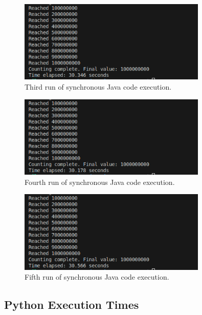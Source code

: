 \documentclass[12pt,a4paper]{article}
\begin{document}
\begin{figure}[htbp]
    \centering
    \includegraphics[width=0.8\textwidth]{../sync_records/results_java/result_3.png}
    \caption{Third run of synchronous Java code execution.}
    \label{fig:Java-runtime-3}
\end{figure}

\begin{figure}[htbp]
    \centering
    \includegraphics[width=0.8\textwidth]{../sync_records/results_java/result_4.png}
    \caption{Fourth run of synchronous Java code execution.}
    \label{fig:Java-runtime-4}
\end{figure}

\begin{figure}[htbp]
    \centering
    \includegraphics[width=0.8\textwidth]{../sync_records/results_java/result_5.png}
    \caption{Fifth run of synchronous Java code execution.}
    \label{fig:Java-runtime-5}
\end{figure}

\clearpage
\subsection{Python Execution Times} 
\end{document}

